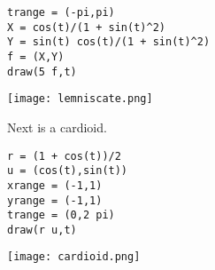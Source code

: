 {\color{blue}
\begin{verbatim}
trange = (-pi,pi)
X = cos(t)/(1 + sin(t)^2)
Y = sin(t) cos(t)/(1 + sin(t)^2)
f = (X,Y)
draw(5 f,t)
\end{verbatim}
}

\begin{center}
\texttt{[image: lemniscate.png]}
\end{center}

\noindent
Next is a cardioid.

{\color{blue}
\begin{verbatim}
r = (1 + cos(t))/2
u = (cos(t),sin(t))
xrange = (-1,1)
yrange = (-1,1)
trange = (0,2 pi)
draw(r u,t)
\end{verbatim}
}

\begin{center}
\texttt{[image: cardioid.png]}
\end{center}
